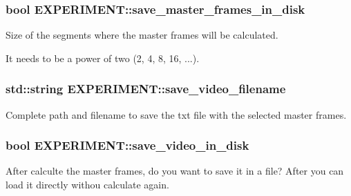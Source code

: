 \subsubsection[{\texorpdfstring{save\+\_\+master\+\_\+frames\+\_\+in\+\_\+disk}{save\_master\_frames\_in\_disk}}]{\setlength{\rightskip}{0pt plus 5cm}bool E\+X\+P\+E\+R\+I\+M\+E\+N\+T\+::save\+\_\+master\+\_\+frames\+\_\+in\+\_\+disk}\hypertarget{structEXPERIMENT_a665b9063cc9475513a16db5b1c7f10a1}{}\label{structEXPERIMENT_a665b9063cc9475513a16db5b1c7f10a1}


Size of the segments where the master frames will be calculated. 

It needs to be a power of two (2, 4, 8, 16, ...). 
\subsubsection[{\texorpdfstring{save\+\_\+video\+\_\+filename}{save\_video\_filename}}]{\setlength{\rightskip}{0pt plus 5cm}std\+::string E\+X\+P\+E\+R\+I\+M\+E\+N\+T\+::save\+\_\+video\+\_\+filename}\hypertarget{structEXPERIMENT_a867146c43457a82a6b2346d8621d70b6}{}\label{structEXPERIMENT_a867146c43457a82a6b2346d8621d70b6}


Complete path and filename to save the txt file with the selected master frames. 

\subsubsection[{\texorpdfstring{save\+\_\+video\+\_\+in\+\_\+disk}{save\_video\_in\_disk}}]{\setlength{\rightskip}{0pt plus 5cm}bool E\+X\+P\+E\+R\+I\+M\+E\+N\+T\+::save\+\_\+video\+\_\+in\+\_\+disk}\hypertarget{structEXPERIMENT_aa392d503b8f79c0d0ee6168226245dd1}{}\label{structEXPERIMENT_aa392d503b8f79c0d0ee6168226245dd1}


After calculte the master frames, do you want to save it in a file? After you can load it directly withou calculate again. 

